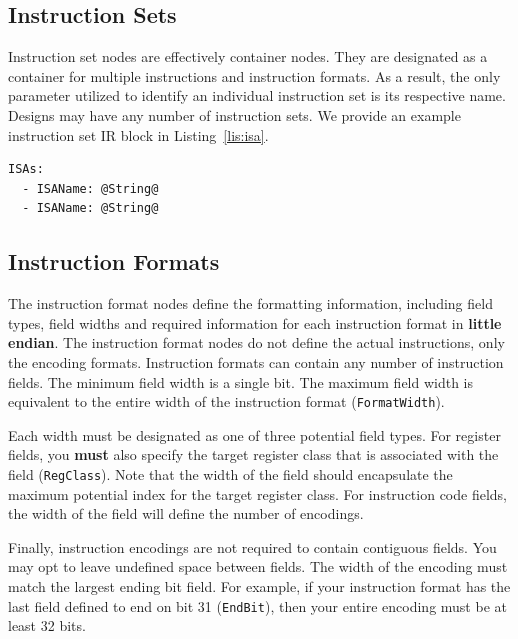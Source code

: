 \documentclass{article}
\begin{document}
\clearpage
\subsection{Instruction Sets}
\label{sec:InstructionSetNodes}

Instruction set nodes are effectively container nodes.  They are designated as a container for multiple 
instructions and instruction formats.  As a result, the only parameter utilized to identify an individual 
instruction set is its respective name.  Designs may have any number of instruction sets.  We provide an 
example instruction set IR block in Listing~\ref{lis:isa}.  

\vspace{0.125in}
\begin{lstlisting}[frame=single,style=base,caption={Instruction Set Node Definition},captionpos=b,label={lis:isa}]
ISAs:
  - ISAName: @String@
  - ISAName: @String@
\end{lstlisting}

\clearpage
\subsection{Instruction Formats}
\label{sec:InstructionFormatNodes}

The instruction format nodes define the formatting information, including field types, field widths and required 
information for each instruction format in \textbf{little endian}.  The instruction format nodes do not define the actual instructions, only 
the encoding formats.  Instruction formats can contain any number of instruction fields.  The minimum field 
width is a single bit.  The maximum field width is equivalent to the entire width of the instruction format (\texttt{FormatWidth}).  

Each width must be designated as one of three potential field types.  For register fields, you \textbf{must} also 
specify the target register class that is associated with the field (\texttt{RegClass}).  Note that the width of the 
field should encapsulate the maximum potential index for the target register class.  For instruction code fields, 
the width of the field will define the number of encodings.

Finally, instruction encodings are not required to contain contiguous fields.  You may opt to leave undefined 
space between fields.  The width of the encoding must match the largest ending bit field.  For example, if 
your instruction format has the last field defined to end on bit 31 (\texttt{EndBit}), then your entire encoding must be at least 
32 bits.   
\end{document}
